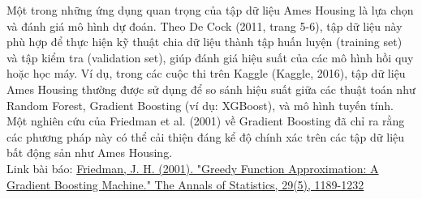 Một trong những ứng dụng quan trọng của tập dữ liệu Ames Housing là lựa chọn và đánh giá mô hình dự đoán. Theo De Cock (2011, trang 5-6), tập dữ liệu này phù hợp để thực hiện kỹ thuật chia dữ liệu thành tập huấn luyện (training set) và tập kiểm tra (validation set), giúp đánh giá hiệu suất của các mô hình hồi quy hoặc học máy. Ví dụ, trong các cuộc thi trên Kaggle (Kaggle, 2016), tập dữ liệu Ames Housing thường được sử dụng để so sánh hiệu suất giữa các thuật toán như Random Forest, Gradient Boosting (ví dụ: XGBoost), và mô hình tuyến tính. Một nghiên cứu của Friedman et al. (2001) về Gradient Boosting đã chỉ ra rằng các phương pháp này có thể cải thiện đáng kể độ chính xác trên các tập dữ liệu bất động sản như Ames Housing.\\
Link bài báo: \href{https://www.jstor.org/stable/2674076}{Friedman, J. H. (2001). "Greedy Function Approximation: A Gradient Boosting Machine." The Annals of Statistics, 29(5), 1189-1232}